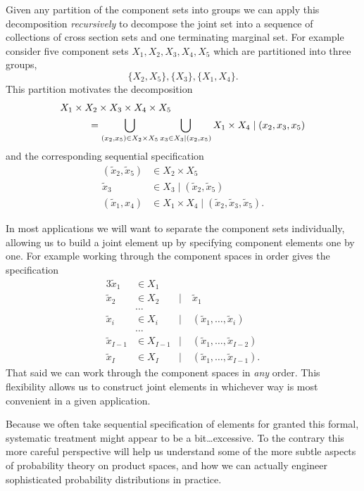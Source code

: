 \documentclass[
  letterpaper,
  DIV=11,
  numbers=noendperiod]{scrartcl}
\begin{document}
Given any partition of the component sets into groups we can apply this
decomposition \emph{recursively} to decompose the joint set into a
sequence of collections of cross section sets and one terminating
marginal set. For example consider five component sets
\(X_{1}, X_{2}, X_{3}, X_{4}, X_{5}\) which are partitioned into three
groups, \[
\{ X_{2}, X_{5} \}, \{ X_{3} \}, \{X_{1}, X_{4} \}.
\] This partition motivates the decomposition \begin{align*}
&X_{1} \times X_{2} \times X_{3} \times X_{4} \times X_{5}
\\
&\hspace{10mm} =
\bigcup_{ (x_{2}, x_{5}) \in X_{2} \times X_{5} }
\bigcup_{ x_{3} \in X_{3} \mid (x_{2}, x_{5}) }
X_{1} \times X_{4} \mid (x_{2}, x_{3}, x_{5})
\end{align*} and the corresponding sequential specification
\begin{align*}
(\tilde{x}_{2}, \tilde{x}_{5}) &\in
X_{2} \times X_{5}
\\
\tilde{x}_{3} &\in
X_{3} \mid (\tilde{x}_{2}, \tilde{x}_{5})
\\
(\tilde{x}_{1}, x_{4}) &\in
X_{1} \times X_{4} \mid (\tilde{x}_{2}, \tilde{x}_{3}, \tilde{x}_{5}).
\end{align*}

In most applications we will want to separate the component sets
individually, allowing us to build a joint element up by specifying
component elements one by one. For example working through the component
spaces in order gives the specification \begin{alignat*}{3}
\tilde{x}_{1} &\in  X_{1} &&
\\
\tilde{x}_{2} &\in X_{2} &\mid& \; \tilde{x}_{1}
\\
&\ldots
\\
\tilde{x}_{i} &\in X_{i} &\mid& \; ( \tilde{x}_{1}, \ldots, \tilde{x}_{i} )
\\
&\ldots
\\
\tilde{x}_{I - 1} &\in X_{I - 1} &\mid& \; ( \tilde{x}_{1}, \ldots, \tilde{x}_{I - 2} )
\\
\tilde{x}_{I} &\in X_{I} &\mid& \; ( \tilde{x}_{1}, \ldots, \tilde{x}_{I - 1} ).
\end{alignat*} That said we can work through the component spaces in
\emph{any} order. This flexibility allows us to construct joint elements
in whichever way is most convenient in a given application.

Because we often take sequential specification of elements for granted
this formal, systematic treatment might appear to be a
bit\ldots excessive. To the contrary this more careful perspective will
help us understand some of the more subtle aspects of probability theory
on product spaces, and how we can actually engineer sophisticated
probability distributions in practice.
\end{document}
